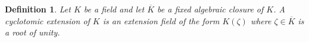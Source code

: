 \documentclass[12pt]{article}
\newtheorem*{defn}{Definition}
\begin{document}
\begin{defn}
Let $K$ be a field and let $\overline{K}$ be a fixed algebraic closure of $K$. A cyclotomic extension of $K$ is an extension field of the form $K(\zeta)$ where $\zeta\in \overline{K}$ is a root of unity.
\end{defn}
\end{document}
